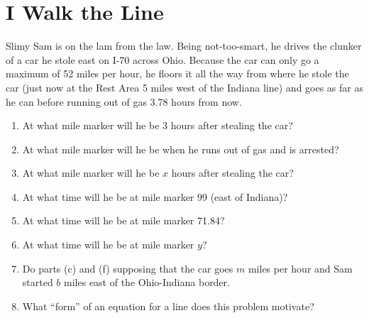 \newpage
\section{I Walk the Line}\label{A:walk}

\begin{prob}
Slimy Sam is on the lam from the law.  Being not-too-smart, he drives
the clunker of a car he stole east on I-70 across Ohio.  Because the
car can only go a maximum of 52 miles per hour, he floors it all the
way from where he stole the car (just now at the Rest Area 5 miles
west of the Indiana line) and goes as far as he can before running out
of gas 3.78 hours from now.

\begin{enumerate}
\item At what mile marker will he be 3 hours after stealing the car?
\item At what mile marker will he be when he runs out of gas and is
  arrested?
\item At what mile marker will he be $x$ hours after
  stealing the car?
\item At what time will he be at mile marker 99 (east of Indiana)?
\item At what time will he be at mile marker 71.84?
\item At what time will he be at mile marker $y$?
\item Do parts (c) and (f) supposing that the car
  goes $m$ miles per hour and Sam started $b$ miles east of the
  Ohio-Indiana border.
\item What ``form'' of an equation for a line does this problem
  motivate?
\end{enumerate}
\end{prob}

